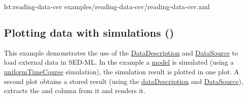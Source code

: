 {lst:reading-data-csv}
{examples/reading-data-csv/reading-data-csv.xml}

\subsection{Plotting data with simulations ()}
This example demonstrates the use of the \hyperref[class:dataDescription]{DataDescription} and \hyperref[class:dataSource]{DataSource} to load external data in SED-ML. In the example a \hyperref[class:model]{model} is simulated (using a \hyperref[class:uniformTimeCourse]{uniformTimeCourse} simulation), the simulation result is plotted in one plot. A second plot obtains a stored result (using the \hyperref[class:dataDescription]{dataDescription} and \hyperref[class:dataSource]{DataSource}), extracts the  and  column from it and renders it.


